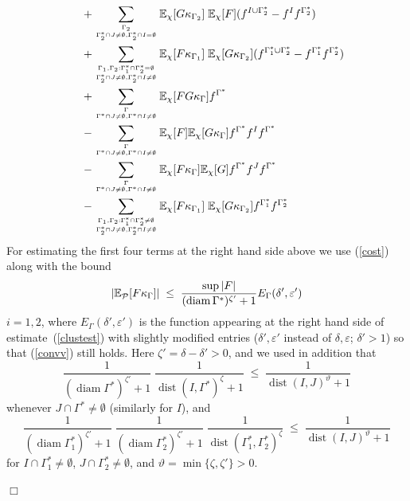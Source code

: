 \documentclass[a4paper,11pt]{article}
\newenvironment{proof}[1][Proof]{{\sc #1.} }{\hfill $\Box$}
\newcommand{\dist}{\mathop{\mathrm{dist}}\nolimits}
\newcommand{\p}{\mathop{\mathrm{{\cal P}}}\nolimits}
\newcommand{\eps}{\varepsilon}
\newcommand{\diam}{\mathop{\mathrm{diam}}\nolimits}
\newcommand {\Ga} {\ensuremath{\Gamma}}
\begin{document}
\begin{proof}
\begin{equation}
\begin{split}
 \\ & \qquad 
+ \sum_{\Ga_2 \atop  \Ga^*_2 \cap J \neq \emptyset , \Ga^*_2 \cap I 
= \emptyset} \mathbb{E}_{\chi} [G \kappa_{\Ga_2}] \; 
\mathbb{E}_\chi [F]  (f^{I \cup \Ga^*_2}-f^{I}f^{\Ga^*_2})
\\
& \qquad + 
\sum_{\Ga_1,\Ga_2 : \Ga^*_1 \cap \Ga^*_2 = \emptyset \atop  \Ga^*_2 
\cap J \neq \emptyset , \Ga^*_2 \cap I \neq \emptyset}  
\mathbb{E}_\chi [F \kappa_{\Ga_1}] \; \mathbb{E}_{\chi} 
[G \kappa_{\Ga_2}]  (f^{\Ga^*_1 \cup \Ga^*_2}-f^{\Ga^*_1}f^{\Ga^*_2})
 \\ & \qquad
+ 
\sum_{\Ga \atop  \Ga^* \cap J \neq \emptyset , \Ga^* \cap I \neq 
\emptyset}  \mathbb{E}_\chi [F G \kappa_{\Ga}] f^{\Ga^*}
 \\ &\qquad
- 
\sum_{\Ga \atop  \Ga^* \cap J \neq \emptyset , \Ga^* \cap I \neq 
\emptyset}  \mathbb{E}_\chi [F ] \mathbb{E}_\chi [ G \kappa_{\Ga}] 
f^{\Ga^*} f^I f^{\Ga^*}
 \\ & \qquad
- 
\sum_{\Ga \atop  \Ga^* \cap J \neq \emptyset , \Ga^* \cap I \neq 
\emptyset}  \mathbb{E}_\chi [F \kappa_{\Ga}] \mathbb{E}_\chi [ G ] 
f^{\Ga^*} f^J f^{\Ga^*}
 \\ & \qquad 
- \sum_{\Ga_1,\Ga_2 : \Ga^*_1 \cap \Ga^*_2 \neq \emptyset \atop  
\Ga^*_2 \cap J \neq \emptyset , \Ga^*_2 \cap I \neq \emptyset}  
\mathbb{E}_\chi [F \kappa_{\Ga_1}] \; \mathbb{E}_{\chi} 
[G \kappa_{\Ga_2}]  f^{\Ga^*_1}f^{\Ga^*_2}
\end{split}
\end{equation}
For estimating the first four terms at the right hand side above we 
use (\ref{cost}) along with the bound
\begin{equation}
|\mathbb{E}_{\p} [F \kappa_{\Ga}]| \; \leq \; \frac{\sup |F|}
{(\diam \Ga^*)^{\zeta'} + 1} E_{\Ga}(\delta',\eps')
\end{equation}
$i = 1, 2$, where $E_{\Ga}(\delta',\eps')$ is the function 
appearing at the right hand side of estimate~(\ref{clustest}) with 
slightly modified entries ($\delta',\eps'$ instead of $\delta,\eps$; 
$\delta' > 1$) so that (\ref{convv}) still holds. Here $\zeta' = 
\delta - \delta' > 0$, and we used in addition that 
\begin{equation}
\frac{1}{(\diam \Ga^*)^{\zeta'} + 1} \; 
\frac{1}{\dist(I,\Ga^*)^\zeta + 1} \; \leq \; 
\frac{1}{\dist(I,J)^\vartheta + 1}
\end{equation}
whenever $J \cap \Ga^* \neq \emptyset$ (similarly for $I$), and
\begin{equation}
\frac{1}{(\diam \Ga^*_1)^{\zeta'} + 1} \; 
\frac{1}{(\diam \Ga^*_2)^{\zeta'} + 1} \; 
\frac{1}{\dist(\Ga^*_1,\Ga^*_2)^\zeta} \; \leq \; 
\frac{1}{\dist(I,J)^\vartheta + 1}
\end{equation}
for $I \cap \Ga^*_1 \neq \emptyset$, $J \cap \Ga^*_2 \neq \emptyset$, 
and $\vartheta = \min \{\zeta,\zeta'\} > 0$.


\end{proof}
\end{document}
